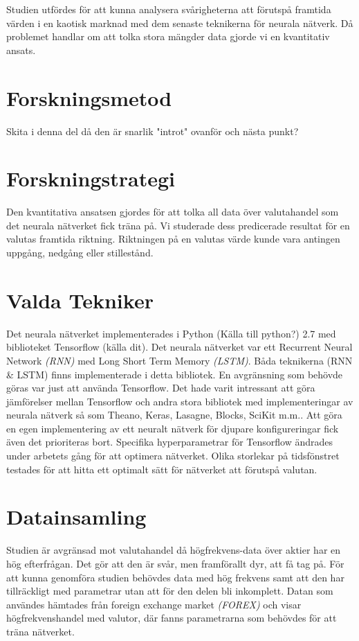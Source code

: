 Studien utfördes för att kunna analysera svårigheterna att förutspå framtida värden i en kaotisk marknad med dem senaste teknikerna för neurala nätverk. Då problemet handlar om att tolka stora mängder data gjorde vi en kvantitativ ansats. 


\section{Forskningsmetod} 
Skita i denna del då den är snarlik "introt" ovanför och nästa punkt?

\section{Forskningstrategi} 
Den kvantitativa ansatsen gjordes för att tolka all data över valutahandel som det neurala nätverket fick träna på. Vi studerade dess predicerade resultat för en valutas framtida riktning. Riktningen på en valutas värde kunde vara antingen uppgång, nedgång eller stillestånd. 

\section{Valda Tekniker} 
Det neurala nätverket implementerades i Python (Källa till python?) 2.7 med biblioteket Tensorflow (källa dit). Det neurala nätverket var ett Recurrent Neural Network \textit{(RNN)} med Long Short Term Memory \textit{(LSTM)}. Båda teknikerna (RNN \& LSTM) finns implementerade i detta bibliotek. En avgränsning som behövde göras var just att använda Tensorflow. Det hade varit intressant att göra jämförelser mellan Tensorflow och andra stora bibliotek med implementeringar av neurala nätverk så som Theano, Keras, Lasagne, Blocks, SciKit m.m.. Att göra en egen implementering av ett neuralt nätverk för djupare konfigureringar fick även det prioriteras bort. Specifika hyperparametrar för Tensorflow ändrades under arbetets gång för att optimera nätverket. Olika storlekar på tidsfönstret testades för att hitta ett optimalt sätt för nätverket att förutspå valutan. 

\section{Datainsamling} 
Studien är avgränsad mot valutahandel då högfrekvens-data över aktier har en hög efterfrågan. Det gör att den är svår, men framförallt dyr, att få tag på. För att kunna genomföra studien behövdes data med hög frekvens samt att den har tillräckligt med parametrar utan att för den delen bli inkomplett. Datan som användes hämtades från foreign exchange market \textit{(FOREX)} och visar högfrekvenshandel med valutor, där fanns parametrarna som behövdes för att träna nätverket. 

